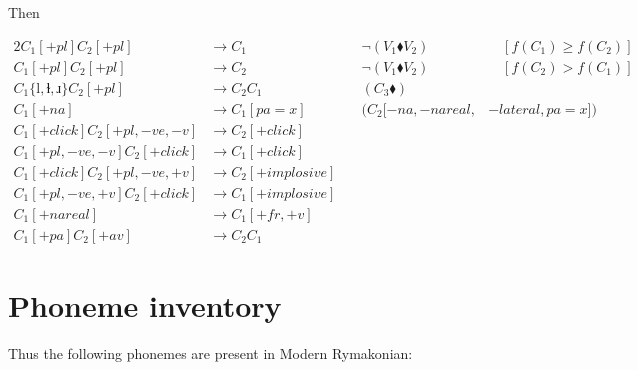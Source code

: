 \documentclass{book}
\newcommand{\lname}{Modern Rymakonian}
\begin{document}
Then

\begin{alignat*}{2}
  C_1[+pl] C_2[+pl] &\rightarrow C_1 &\quad \lnot(V_1 \blacklozenge V_2) &\quad[f(C_1) \ge f(C_2)] \\
  C_1[+pl] C_2[+pl] &\rightarrow C_2 &\quad \lnot(V_1 \blacklozenge V_2) &\quad[f(C_2) > f(C_1)] \\
  C_1\{\text{l}, \text{ɫ}, \text{ɹ}\} C_2[+pl] &\rightarrow C_2 C_1 &\quad(C_3 \blacklozenge) \\
  C_1[+na] &\rightarrow C_1[pa=x] &\quad(C_2[-na, -nareal,& -lateral, pa=x]) \\
  C_1[+click] C_2[+pl, -ve, -v] &\rightarrow C_2[+click] \\
  C_1[+pl, -ve, -v] C_2[+click] &\rightarrow C_1[+click] \\
  C_1[+click] C_2[+pl, -ve, +v] &\rightarrow C_2[+implosive] \\
  C_1[+pl, -ve, +v] C_2[+click] &\rightarrow C_1[+implosive] \\
  C_1[+nareal] &\rightarrow C_1[+fr, +v] \\
  C_1[+pa] C_2[+av] &\rightarrow C_2 C_1
\end{alignat*}

\section{Phoneme inventory}

Thus the following phonemes are present in \lname:
\end{document}
